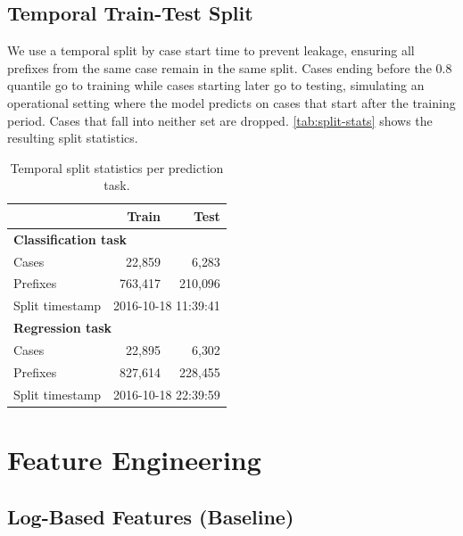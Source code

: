 \documentclass[runningheads]{llncs}
\begin{document}
\subsection{Temporal Train-Test Split}
\label{sec:split}

We use a temporal split by case start time to prevent leakage, ensuring all
prefixes from the same case remain in the same split. Cases ending before the 0.8
quantile go to training while cases starting later go to testing, simulating an
operational setting where the model predicts on cases that start after the
training period. Cases that fall into neither set are dropped. \autoref{tab:split-stats} shows the resulting split
statistics.

\begin{table}[t]
    \centering
    \caption{Temporal split statistics per prediction task.}
    \label{tab:split-stats}
    \begin{tabular}{lrr}
        \toprule
        & Train & Test \\
        \midrule
        \multicolumn{3}{l}{\textbf{Classification task}} \\
        Cases           & 22{,}859  & 6{,}283 \\
        Prefixes        & 763{,}417 & 210{,}096 \\
        Split timestamp & \multicolumn{2}{c}{2016-10-18 11:39:41} \\
        \midrule
        \multicolumn{3}{l}{\textbf{Regression task}} \\
        Cases           & 22{,}895  & 6{,}302 \\
        Prefixes        & 827{,}614 & 228{,}455 \\
        Split timestamp & \multicolumn{2}{c}{2016-10-18 22:39:59} \\
        \bottomrule
    \end{tabular}
\end{table}

\section{Feature Engineering}
\label{sec:features}

\subsection{Log-Based Features (Baseline)}
\label{sec:log-features}
\end{document}
